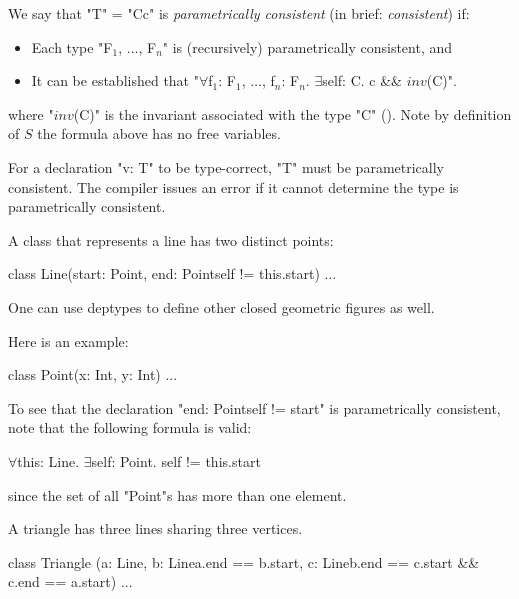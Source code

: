 We say that \xcd"T" = \xcd"C{c}" is {\em parametrically consistent} (in brief:
{\em consistent}) if:

\begin{itemize}
\item Each type \xcdmath"F$_1$, $\dots$, F$_n$" is (recursively) parametrically consistent, and
\item It can be established that
\xcdmath"$\forall$f$_1$: F$_1$, $\dots$, f$_n$: F$_n$. $\exists$self: C. c && $\mathit{inv}$(C)".
\end{itemize}

\noindent
where \xcdmath"$\mathit{inv}$(C)" is the invariant associated
with the type \xcd"C" ().  Note by
definition of $S$ the formula above has no free variables.

\begin{staticrule*}
For a declaration \xcd"v: T" to be type-correct, \xcd"T" must be parametrically
consistent. The compiler issues an error if it cannot determine
the type is parametrically consistent.
\end{staticrule*}

\begin{example}

A class that represents a line has two distinct points:

\begin{xten}
class Line(start: Point, 
           end: Point{self != this.start}) {...}      
\end{xten}
\end{example}

One can use deptypes to define other closed geometric figures as well.

\begin{example}
Here is an example:
\begin{xten}
class Point(x: Int, y: Int) {...}
\end{xten}
\end{example}


To see that the declaration \xcd"end: Point{self != start}" is
parametrically consistent, note that the following formula is valid:
\begin{xtenmath}
$\forall$this: Line. $\exists$self: Point. self != this.start  
\end{xtenmath}
\noindent since the set of all \xcd"Point"s has more than one element.

\begin{example}
A triangle has three lines sharing three vertices.
\begin{xten}
class Triangle 
 (a: Line, 
  b: Line{a.end == b.start}, 
  c: Line{b.end == c.start && c.end == a.start}) 
 { ... }
\end{xten}
\end{example}



